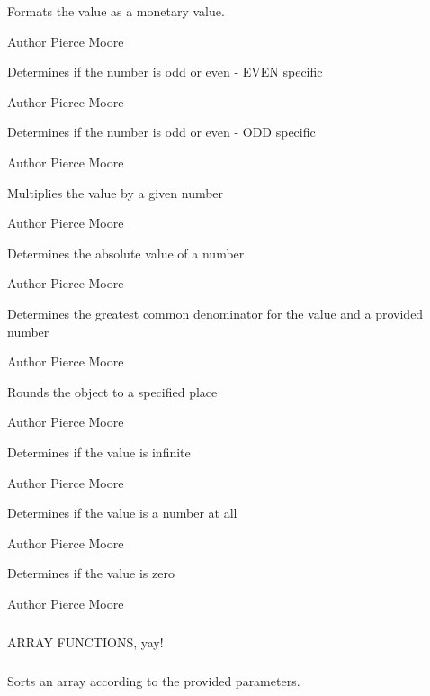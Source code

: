 Formats the value as a monetary value.

\begin{DoxyAuthor}{Author}
Pierce Moore
\end{DoxyAuthor}
Determines if the number is odd or even -\/ E\-V\-E\-N specific

\begin{DoxyAuthor}{Author}
Pierce Moore
\end{DoxyAuthor}
Determines if the number is odd or even -\/ O\-D\-D specific

\begin{DoxyAuthor}{Author}
Pierce Moore
\end{DoxyAuthor}
Multiplies the value by a given number

\begin{DoxyAuthor}{Author}
Pierce Moore
\end{DoxyAuthor}
Determines the absolute value of a number

\begin{DoxyAuthor}{Author}
Pierce Moore
\end{DoxyAuthor}
Determines the greatest common denominator for the value and a provided number

\begin{DoxyAuthor}{Author}
Pierce Moore
\end{DoxyAuthor}
Rounds the object to a specified place

\begin{DoxyAuthor}{Author}
Pierce Moore
\end{DoxyAuthor}
Determines if the value is infinite

\begin{DoxyAuthor}{Author}
Pierce Moore
\end{DoxyAuthor}
Determines if the value is a number at all

\begin{DoxyAuthor}{Author}
Pierce Moore
\end{DoxyAuthor}
Determines if the value is zero

\begin{DoxyAuthor}{Author}
Pierce Moore
\end{DoxyAuthor}
\subparagraph*{}

\begin{DoxyVerb}                   ARRAY FUNCTIONS, yay!\end{DoxyVerb}
 \subparagraph*{}

Sorts an array according to the provided parameters.

